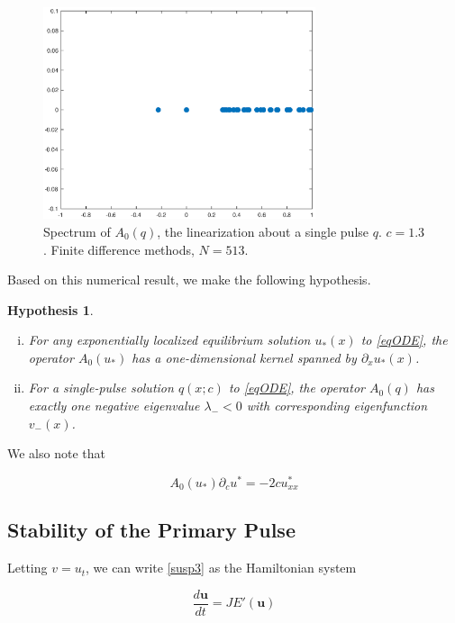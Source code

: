 \documentclass[12pt]{article}
\newtheorem{hypothesis}{Hypothesis}
\begin{document}
\begin{figure}[H]
\centering
\includegraphics[width=8cm]{specA0.eps}
\caption{Spectrum of $A_0(q)$, the linearization about a single pulse $q$. $c = 1.3$. Finite difference methods, $N = 513$.}
\end{figure}

Based on this numerical result, we make the following hypothesis.

\begin{hypothesis}\label{hyp_A0neg}
\begin{enumerate}[(i)]
\mbox{}
\item For any exponentially localized equilibrium solution $u_*(x)$ to \eqref{eqODE}, the operator $A_0(u_*)$ has a one-dimensional kernel spanned by $\partial_x u_*(x)$. 
\item For a single-pulse solution $q(x; c)$ to \eqref{eqODE}, the operator $A_0(q)$ has exactly one negative eigenvalue $\lambda_- < 0$ with corresponding eigenfunction $v_-(x)$.
\end{enumerate}
\end{hypothesis}

We also note that 

\begin{equation}\label{uc}
A_0(u_*) \partial_c u^* = -2 c u^*_{xx}
\end{equation}

\subsection{Stability of the Primary Pulse}

Letting $v = u_t$, we can write \eqref{susp3} as the Hamiltonian system

\begin{equation}\label{2dsystem}
\frac{d \textbf{u} }{dt} = J E'(\textbf{u})
\end{equation}
\end{document}
